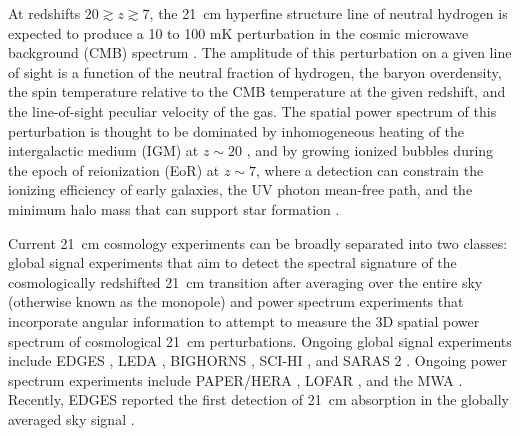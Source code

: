 \documentclass[twocolumn]{aastex61}
\begin{document}
At redshifts $20 \gtrsim z \gtrsim 7$, the 21~cm hyperfine structure line of neutral hydrogen is
expected to produce a 10 to 100 mK perturbation in the cosmic microwave background (CMB) spectrum
\citep{2006PhR...433..181F, 2012RPPh...75h6901P}. The amplitude of this perturbation on a given line
of sight is a function of the neutral fraction of hydrogen, the baryon overdensity, the spin
temperature relative to the CMB temperature at the given redshift, and the line-of-sight peculiar
velocity of the gas.  The spatial power spectrum of this perturbation is thought to be dominated by
inhomogeneous heating of the intergalactic medium (IGM) at $z\sim 20$ \citep{2014MNRAS.437L..36F},
and by growing ionized bubbles during the epoch of reionization (EoR) at $z\sim 7$, where a
detection can constrain the ionizing efficiency of early galaxies, the UV photon mean-free path, and
the minimum halo mass that can support star formation \citep{2015MNRAS.449.4246G}.

Current 21~cm cosmology experiments can be broadly separated into two classes: global signal
experiments that aim to detect the spectral signature of the cosmologically redshifted 21~cm
transition after averaging over the entire sky (otherwise known as the monopole) and power spectrum
experiments that incorporate angular information to attempt to measure the 3D spatial power spectrum
of cosmological 21~cm perturbations.  Ongoing global signal experiments include EDGES
\citep{2017ApJ...847...64M}, LEDA \citep{2017arXiv170909313P}, BIGHORNS \citep{2015PASA...32....4S},
SCI-HI \citep{2014ApJ...782L...9V}, and SARAS 2 \citep{2017arXiv170306647S}.  Ongoing power spectrum
experiments include PAPER/HERA \citep{2015ApJ...809...61A, 2016arXiv160607473D}, LOFAR
\citep{2017ApJ...838...65P}, and the MWA \citep{2016ApJ...833..102B, 2016MNRAS.460.4320E}. Recently,
EDGES reported the first detection of 21~cm absorption in the globally averaged sky signal
\citep{2018Natur.555...67B}.
\end{document}

